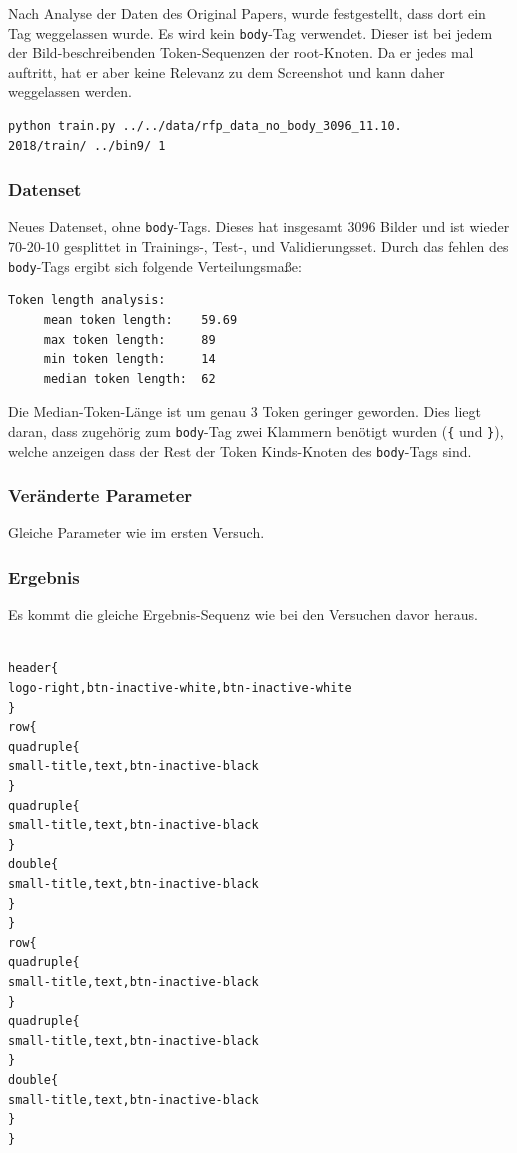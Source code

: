 \documentclass[pdftex,a4paper,halfparskip, article]{scrartcl}
\begin{document}
Nach Analyse der Daten des Original Papers, wurde festgestellt, dass dort ein Tag weggelassen wurde. Es wird kein \texttt{body}-Tag verwendet. Dieser ist bei jedem der Bild-beschreibenden Token-Sequenzen der root-Knoten. Da er jedes mal auftritt, hat er aber keine Relevanz zu dem Screenshot und kann daher weggelassen werden.

\begin{verbatim}
python train.py ../../data/rfp_data_no_body_3096_11.10.
2018/train/ ../bin9/ 1

\end{verbatim}

\subsubsection*{Datenset}

Neues Datenset, ohne \texttt{body}-Tags. Dieses hat insgesamt 3096 Bilder und ist wieder 70-20-10 gesplittet in Trainings-, Test-, und Validierungsset. Durch das fehlen des \texttt{body}-Tags ergibt sich folgende Verteilungsmaße:
\begin{verbatim}
Token length analysis:
     mean token length:    59.69
     max token length:     89
     min token length:     14
     median token length:  62
\end{verbatim}

Die Median-Token-Länge ist um genau 3 Token geringer geworden. Dies liegt daran, dass zugehörig zum \texttt{body}-Tag zwei Klammern benötigt wurden (\texttt{\{} und \texttt{\}}), welche anzeigen dass der Rest der Token Kinds-Knoten des \texttt{body}-Tags sind.

\subsubsection*{Veränderte Parameter}

Gleiche Parameter wie im ersten Versuch.

\subsubsection*{Ergebnis}

Es kommt die gleiche Ergebnis-Sequenz wie bei den Versuchen davor heraus.

\begin{verbatim}

header{
logo-right,btn-inactive-white,btn-inactive-white
}
row{
quadruple{
small-title,text,btn-inactive-black
}
quadruple{
small-title,text,btn-inactive-black
}
double{
small-title,text,btn-inactive-black
}
}
row{
quadruple{
small-title,text,btn-inactive-black
}
quadruple{
small-title,text,btn-inactive-black
}
double{
small-title,text,btn-inactive-black
}
}

\end{verbatim}
\end{document}
